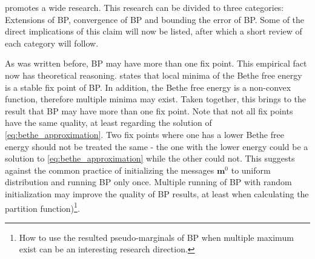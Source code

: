  promotes a wide research.
This research can be divided to three categories:
Extensions of BP, convergence of BP and bounding the error of BP.
Some of the direct implications of this claim will now be listed, after which a short review of each category will follow.

As was written before, BP may have more than one fix point.
This empirical fact now has theoretical reasoning. 
 states that local minima of the Bethe free energy is a stable fix point of BP.
In addition, the Bethe free energy is a non-convex function, therefore multiple minima may exist.
Taken together, this brings to the result that BP may have more than one fix point.
Note that not all fix points have the same quality, at least regarding the solution of \eqref{eq:bethe_approximation}.
Two fix points where one has a lower Bethe free energy should not be treated the same - the one with the lower energy could be a solution to \eqref{eq:bethe_approximation} while the other could not.
This suggests against the common practice of initializing the messages $\boldsymbol{m}^0$ to uniform distribution and running BP only once.
Multiple running of BP with random initialization may improve the quality of BP results, at least when calculating the partition function)\footnote{How to use the resulted pseudo-marginals of BP when multiple maximum exist can be an interesting research direction.}.

